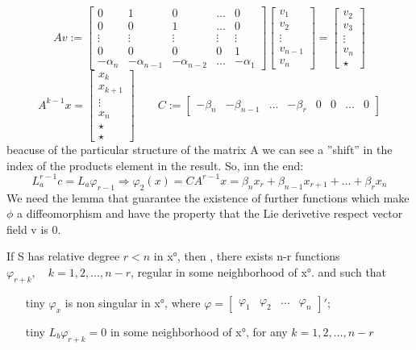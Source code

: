 \begin{equation*}
	Av:=\begin{bmatrix}
		0 & 1 & 0 & \dots & 0 \\
		0 & 0 & 1 &  \dots & 0 \\
		\vdots& \vdots & \vdots & \vdots & \vdots \\
		0& 0 & 0 & 0 & 1 \\
		-\alpha_n &-\alpha_{n-1} & -\alpha_{n-2} & \dots & -\alpha_1 
	\end{bmatrix} 
	\begin{bmatrix}
		v_1	\\
		v_2	\\
		\vdots	\\
		v_{n-1}\\
		v_n
	\end{bmatrix}=
	\begin{bmatrix}
	v_2	\\
	v_3	\\
	\vdots	\\
	v_{n}\\
	\star
\end{bmatrix}
\end{equation*}
\begin{equation*}
	A^{k-1}x=
	\begin{bmatrix}
		x_k	\\
		x_{k+1}	\\
		\vdots	\\
		x_n\\
		\star\\
		\star
	\end{bmatrix}\qquad
	C:=\begin{bmatrix}
		-\beta_n&-\beta_{n-1}  & \dots &-\beta_r  & 0 &0  & \dots & 0 
	\end{bmatrix}
\end{equation*} beacuse of the particular structure of the matrix A we can see a ''shift'' in the index of the products element in the result.
So, inn the end:\[
L_a^{r-1}c=L_a\varphi_{r-1} \Rightarrow \varphi_2(x)=CA^{r-1}x=\beta_nx_r+\beta_{n-1}x_{r+1}+\dots+\beta_rx_n
\] We need the lemma that guarantee the existence of further functions which make $\phi$ a diffeomorphism and have the property that the Lie derivetive respect vector field v is 0.
\begin{lemma}
	If S has relative degree $r<n$ in x°, then , there exists n-r functions $\varphi_{r+k},\quad k=1,2,\dots,n-r$, regular in some neighborhood of x°. and such that \begin{itemize}
		\item[tiny] $\varphi_x$ is non singular in x°, where $\varphi=\begin{bmatrix} \varphi_1 & \varphi_2 & 	\dots & \varphi_n
		\end{bmatrix}'$;
		\item[tiny] $L_b\varphi_{r+k}=0$ in some neighborhood of x°, for any $k=1,2,\dots,n-r$
	\end{itemize} 
\end{lemma}
